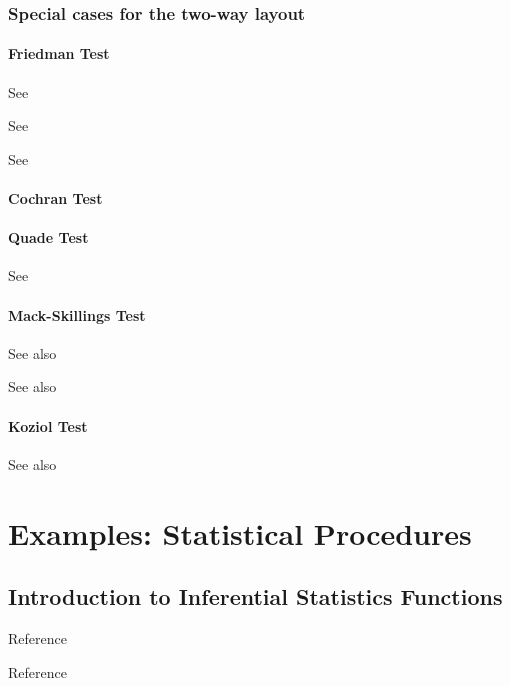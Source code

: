 \subsection{Special cases for the two-way layout}
\subsubsection{Friedman Test}
See \cite{Skillings_1981}

See \cite{Roehmel_1997}

See \cite{Gansky_2001}

\subsubsection{Cochran Test}


\subsubsection{Quade Test}


See \cite{Quade_1979}

\subsubsection{Mack-Skillings Test}


See also \cite{Mack_1980}


See also \cite{Skillings_1981}


\subsubsection{Koziol Test}


See also \cite{Koziol1982}









\chapter{Examples: Statistical Procedures}



\section{Introduction to Inferential Statistics Functions}

Reference \cite{bortz_distribution_1990}

Reference \cite{conover1981}


